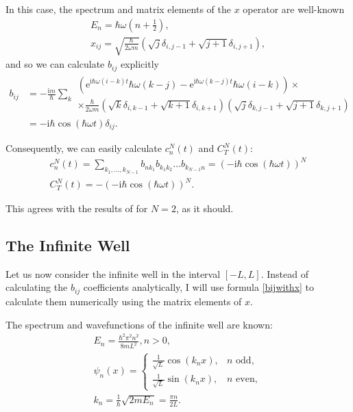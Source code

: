 \documentclass{article}
\newcommand{\e}{\mathrm{e}}
\newcommand{\I}{\mathrm{i}}
\begin{document}
In this case, the spectrum and matrix elements of the $x$ operator are well-known
\begin{gather}
E_n = \hbar \omega (n + \tfrac12),\\
x_{ij} = \sqrt{\frac\hbar{2 \omega m}} (\sqrt{j} \delta_{i,j-1} + \sqrt{j+1} \delta_{i,j+1}), %
\end{gather}
and so we can calculate $b_{ij}$ explicitly
\begin{align*}
b_{ij} &= -\frac{\I m}{\hbar} \sum_k \begin{multlined}
\left(\e^{\I \hbar \omega (i-k) t} \hbar \omega (k - j) - \e^{\I \hbar \omega (k-j) t} \hbar \omega (i - k) \right) \times\\
\times \frac{\hbar}{2 \omega m} (\sqrt k \delta_{i, k-1} + \sqrt{k+1} \delta_{i, k+1}) (\sqrt j \delta_{k, j-1} + \sqrt{j+1} \delta_{k, j+1})\end{multlined}\\
&= - \I \hbar \cos(\hbar \omega t) \delta_{ij}.
\end{align*}

Consequently, we can easily calculate $c_n^N(t)$ and $C_T^N(t)$:
\begin{gather*}
c_n^N(t) = \sum_{k_1,\dots, k_{N-1}} b_{nk_1} b_{k_1 k_2} \dots b_{k_{N-1}n} = \left( -\I \hbar \cos(\hbar \omega t) \right)^N\\
C_T^N(t) = - \left( -\I \hbar \cos(\hbar \omega t) \right)^N.
\end{gather*}

This agrees with the results of \cite{Hashimoto_2017} for $N = 2$, as it should.

\subsection{The Infinite Well}

Let us now consider the infinite well in the interval $[-L, L]$. Instead of calculating the $b_{ij}$ coefficients analytically, I will use formula \eqref{bijwithx} to calculate them numerically using the matrix elements of $x$.

The spectrum and wavefunctions of the infinite well are known:
\begin{gather*}
E_n = \frac{\hbar^2 \pi^2 n^2}{8 m L^2}, n > 0,\\
\psi_n(x) = \begin{cases}
\frac1{\sqrt L} \cos(k_n x), & \text{$n$ odd},\\
\frac1{\sqrt L} \sin(k_n x), & \text{$n$ even},
\end{cases}\\
k_n = \frac1\hbar \sqrt{2 m E_n} = \frac{\pi n}{2 L}.
\end{gather*}
\end{document}

